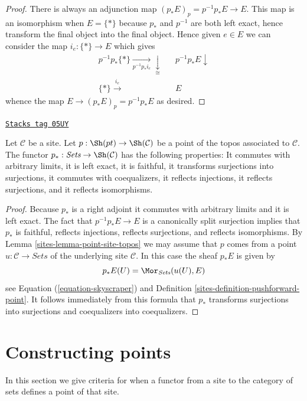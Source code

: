 \begin{proof}
There is always an adjunction map $(p_*E)_p = p^{-1}p_*E \to E$.
This map is an isomorphism when $E = \{*\}$ because $p_*$
and $p^{-1}$ are both left exact, hence transform the final
object into the final object. Hence given $e \in E$ we can consider
the map $i_e : \{*\} \to E$ which gives
$$
\begin{array}{ccc}p^{-1}p_*\{*\} \underset{p^{-1}p_*i_e}{\longrightarrow}\underset{\cong}{\downarrow} &  & p^{-1}p_*E \downarrow \\ \{*\} \overset{i_e}{\longrightarrow} &  & E\end{array}
$$
whence the map $E \to (p_*E)_p = p^{-1}p_*E$ as desired.
\end{proof}

\begin{lemma}
\label{sites-lemma-skyscraper-functor-exact}
\href{https://stacks.math.columbia.edu/tag/05UY}{\texttt{Stacks tag 05UY}}

Let $\mathcal{C}$ be a site. Let
$p : \Sh(pt) \to \Sh(\mathcal{C})$ be a point of
the topos associated to $\mathcal{C}$.
The functor $p_* : \textit{Sets} \to \Sh(\mathcal{C})$
has the following properties: It commutes with arbitrary limits,
it is left exact, it is faithful, it transforms surjections into surjections,
it commutes with coequalizers, it reflects injections, it reflects
surjections, and it reflects isomorphisms.
\end{lemma}

\begin{proof}

Because $p_*$ is a right adjoint it commutes with arbitrary limits and
it is left exact. The fact that $p^{-1}p_*E \to E$ is a canonically
split surjection implies that $p_*$ is faithful, reflects injections,
reflects surjections, and reflects isomorphisms. By
Lemma \ref{sites-lemma-point-site-topos}
we may assume that $p$ comes from a point $u : \mathcal{C} \to \textit{Sets}$
of the underlying site $\mathcal{C}$. In this case the sheaf $p_*E$ is given by
$$
p_*E(U) = \Mor_{\textit{Sets}}(u(U), E)
$$
see Equation (\ref{equation-skyscraper}) and
Definition \ref{sites-definition-pushforward-point}.
It follows immediately from this formula that $p_*$ transforms
surjections into surjections and coequalizers into coequalizers.
\end{proof}

\section{Constructing points}
\label{sites-section-construct-points}
In this section we give criteria for when a functor
from a site to the category of sets defines a point of that site.

